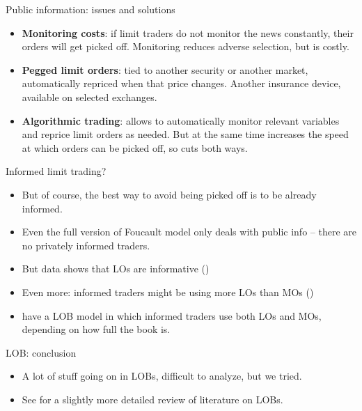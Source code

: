 \documentclass[english,10pt
,aspectratio=169
]{beamer}
\begin{document}
\begin{frame}{Public information: issues and solutions}
	\begin{itemize}[<+->]
		\item \textbf{Monitoring costs}: if limit traders do not monitor the news constantly, their orders will get picked off. Monitoring reduces adverse selection, but is costly.
		\item \textbf{Pegged limit orders}: tied to another security or another market, automatically repriced when that price changes. Another insurance device, available on selected exchanges.
		\item \textbf{Algorithmic trading}: allows to automatically monitor relevant variables and reprice limit orders as needed. But at the same time increases the speed at which orders can be picked off, so cuts both ways.
	\end{itemize}
\end{frame}


\begin{frame}{Informed limit trading?}
	\begin{itemize}
		\item But of course, the best way to avoid being picked off is to be already informed.
		\item Even the full version of Foucault model only deals with public info -- there are no privately informed traders.
		\item But data shows that LOs are informative (\citet*{biais_empirical_1995,beber_order_2005,cao_information_2009})
		\item Even more: informed traders might be using more LOs than MOs (\cite{kaniel_so_2006})
		\item \cite{bhattacharya_limit_2020} have a LOB model in which informed traders use both LOs and MOs, depending on how full the book is.
	\end{itemize}
\end{frame}


\begin{frame}{LOB: conclusion}
	\begin{itemize}
		\item A lot of stuff going on in LOBs, difficult to analyze, but we tried.
		\item See \cite{parlour_limit_2008} for a slightly more detailed review of literature on LOBs.
	\end{itemize}
\end{frame}
\end{document}
